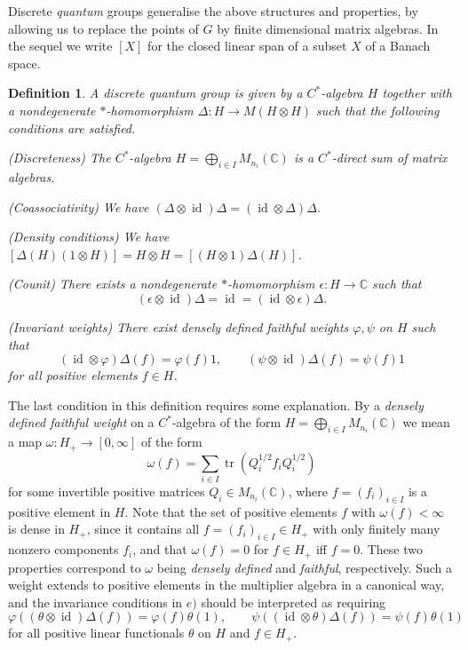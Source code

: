 \documentclass[a4paper]{amsart}
\DeclareMathOperator{\id}{id}
\DeclareMathOperator{\tr}{tr}
\newenvironment{bnum}
{\begin{list}{}
    {\setlength{\labelwidth}{15pt}
     \setlength{\leftmargin}{\labelwidth}
    }
}
{\end{list}}
\numberwithin{equation}{section}
\theoremstyle{change}
\newtheorem{definition}[theorem]{Definition}
\begin{document}
Discrete \emph{quantum} groups generalise the above structures and properties, by allowing us to replace the points of $ G $ by finite dimensional matrix algebras. 
In the sequel we write $ [X] $ for the closed linear span of a subset $ X $ of a Banach space.  

\begin{definition} \label{defdiscreteqg}
A discrete quantum group is given by a $ C^* $-algebra $ H $ together with a nondegenerate $ * $-homomorphism $ \Delta: H \rightarrow M(H \otimes H) $ such that 
the following conditions are satisfied.  
\begin{bnum} 
\item[a)] (Discreteness) The $ C^* $-algebra $ H = \bigoplus_{i \in I} M_{n_i}(\mathbb{C}) $ is a $ C^* $-direct sum of matrix algebras. 
\item[b)] (Coassociativity) We have $ (\Delta \otimes \id)\Delta = (\id \otimes \Delta)\Delta $. 
\item[c)] (Density conditions) We have $ [\Delta(H)(1 \otimes H)] = H \otimes H = [(H \otimes 1)\Delta(H)] $.
\item[d)] (Counit) There exists a nondegenerate $ * $-homomorphism $ \epsilon: H \rightarrow \mathbb{C} $ such that 
$$ 
(\epsilon \otimes \id)\Delta = \id = (\id \otimes \epsilon)\Delta.
$$
\item[e)] (Invariant weights) There exist densely defined faithful weights $ \varphi, \psi $ on $ H $ such that 
$$ 
(\id \otimes \varphi)\Delta(f) = \varphi(f) 1, \qquad (\psi \otimes \id)\Delta(f) = \psi(f) 1 
$$ 
for all positive elements $ f \in H $. 
\end{bnum} 
\end{definition} 

The last condition in this definition requires some explanation. By 
a \emph{densely defined faithful weight} on a $ C^* $-algebra of the form $ H = \bigoplus_{i \in I} M_{n_i}(\mathbb{C}) $ 
we mean 
a map $ \omega: H_+ \to [0, \infty] $ of the form 
$$
\omega(f) = \sum_{i \in I} \tr(Q_i^{1/2} f_i Q_i^{1/2}) 
$$
for some invertible positive matrices $ Q_i \in M_{n_i}(\mathbb{C}) $, where $ f = (f_i)_{i \in I} $ is a positive element in $ H $. Note that the set of positive elements $ f $ with $ \omega(f) < \infty $ is dense in $ H_+ $, since it contains all $ f = (f_i)_{i \in I} \in H_+ $ with only finitely many nonzero components $ f_i $, and that $ \omega(f) = 0 $ for $ f \in H_+ $ iff $ f = 0 $. These two properties correspond to $ \omega $ being \emph{densely defined} and \emph{faithful}, respectively. Such a weight extends to positive elements in the multiplier algebra in a canonical way, and the invariance conditions in $ e) $ should be interpreted as requiring 
$$
\varphi((\theta \otimes \id)\Delta(f)) = \varphi(f) \theta(1), \qquad \psi((\id \otimes \theta)\Delta(f)) = \psi(f) \theta(1) 
$$
for all positive linear functionals $ \theta $ on $ H $ and $ f \in H_+ $. 
\end{document}
